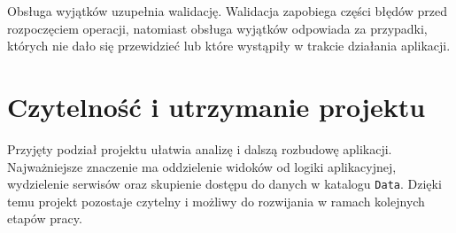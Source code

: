 Obsługa wyjątków uzupełnia walidację. Walidacja zapobiega części błędów przed rozpoczęciem operacji, natomiast obsługa wyjątków odpowiada za przypadki, których nie dało się przewidzieć lub które wystąpiły w trakcie działania aplikacji.

\section{Czytelność i utrzymanie projektu}

Przyjęty podział projektu ułatwia analizę i dalszą rozbudowę aplikacji. Najważniejsze znaczenie ma oddzielenie widoków od logiki aplikacyjnej, wydzielenie serwisów oraz skupienie dostępu do danych w katalogu \texttt{Data}. Dzięki temu projekt pozostaje czytelny i możliwy do rozwijania w ramach kolejnych etapów pracy.